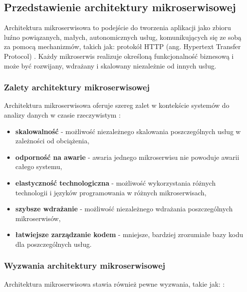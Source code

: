 \subsection{Przedstawienie architektury mikroserwisowej}
\label{subsec:architektura_mikroserwisowa}

Architektura mikroserwisowa to podejście do tworzenia aplikacji jako zbioru luźno powiązanych, małych, autonomicznych usług,
komunikujących się ze sobą za pomocą mechanizmów, takich jak: protokół HTTP (ang. Hypertext Transfer Protocol) \cite{rfc_http1_1, microservice_architecture}.
Każdy mikroserwis realizuje określoną funkcjonalność biznesową i może być rozwijany, wdrażany i skalowany niezależnie od innych usług.

\subsubsection{Zalety architektury mikroserwisowej}
\label{subsubsec:zalety_mikroserwisow}

Architektura mikroserwisowa oferuje szereg zalet w kontekście systemów do analizy danych w czasie rzeczywistym \cite{microservice_benefits}:

\begin{itemize}
    \item \textbf{skalowalność} - możliwość niezależnego skalowania poszczególnych usług w zależności od obciążenia,
    \item \textbf{odporność na awarie} - awaria jednego mikroserwisu nie powoduje awarii całego systemu,
    \item \textbf{elastyczność technologiczna} - możliwość wykorzystania różnych technologii i języków programowania w różnych mikroserwisach,
    \item \textbf{szybsze wdrażanie} - możliwość niezależnego wdrażania poszczególnych mikroserwisów,
    \item \textbf{łatwiejsze zarządzanie kodem} - mniejsze, bardziej zrozumiałe bazy kodu dla poszczególnych usług.
\end{itemize}

\subsubsection{Wyzwania architektury mikroserwisowej}
\label{subsubsec:wyzwania_mikroserwisow}

Architektura mikroserwisowa stawia również pewne wyzwania, takie jak: \cite{microservice_challenges}:

